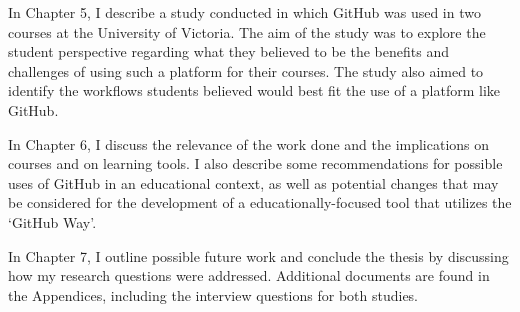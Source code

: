 In Chapter 5, I describe a study conducted in which GitHub was used in two courses at the University of Victoria. The aim of the study was to explore the student perspective regarding what they believed to be the benefits and challenges of using such a platform for their courses. The study also aimed to identify the workflows students believed would best fit the use of a platform like GitHub.

In Chapter 6, I discuss the relevance of the work done and the implications on courses and on learning tools. I also describe some recommendations for possible uses of GitHub in an educational context, as well as potential changes that may be considered for the development of a educationally-focused tool that utilizes the `GitHub Way'.

In Chapter 7, I outline possible future work and conclude the thesis by discussing how my research questions were addressed. Additional documents are found in the Appendices, including the interview questions for both studies.



